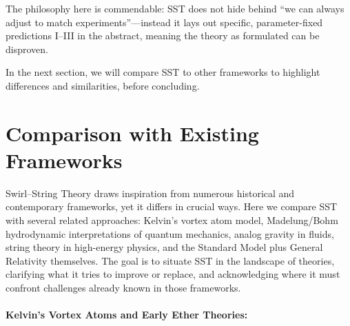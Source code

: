 \documentclass[10pt,reprint,aps,onecolumn,nofootinbib]{revtex4-2}
\begin{document}
The philosophy here is commendable: SST does not hide behind ``we can always adjust to match experiments''---instead it lays out specific, parameter-fixed predictions I--III in the abstract, meaning the theory as formulated can be disproven.

In the next section, we will compare SST to other frameworks to highlight differences and similarities, before concluding.


\section{Comparison with Existing Frameworks}

Swirl–String Theory draws inspiration from numerous historical and contemporary frameworks, yet it differs in crucial ways. Here we compare SST with several related approaches: Kelvin’s vortex atom model, Madelung/Bohm hydrodynamic interpretations of quantum mechanics, analog gravity in fluids, string theory in high-energy physics, and the Standard Model plus General Relativity themselves. The goal is to situate SST in the landscape of theories, clarifying what it tries to improve or replace, and acknowledging where it must confront challenges already known in those frameworks.


\paragraph{Kelvin’s Vortex Atoms and Early Ether Theories:}
\end{document}
